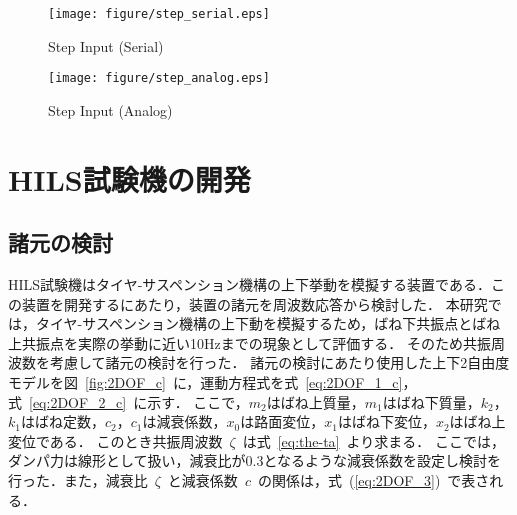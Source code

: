 \documentclass[a4paper,12pt]{article_vdlab_sotsuron}
\begin{document}
\vspace{10mm}
\begin{figure}[h]
  \begin{center}
  \hspace{5mm}
   \texttt{[image: figure/step\_serial.eps]}
   \hspace{-5mm}
  \vspace{2mm}
\caption{Step Input (Serial)}
  \label{fig:step_serial}
  \end{center}
\end{figure}
  \vspace{10mm}
\begin{figure}[h]
  \begin{center}
  \hspace{5mm}
   \texttt{[image: figure/step\_analog.eps]}
   \hspace{-5mm}
  \vspace{2mm}
\caption{Step Input (Analog)}
  \label{fig:step_analog}
  \end{center}
\end{figure}



\newpage
\section{HILS試験機の開発}
\subsection{諸元の検討}
HILS試験機はタイヤ-サスペンション機構の上下挙動を模擬する装置である．この装置を開発するにあたり，装置の諸元を周波数応答から検討した．
本研究では，タイヤ-サスペンション機構の上下動を模擬するため，ばね下共振点とばね上共振点を実際の挙動に近い10Hzまでの現象として評価する．
そのため共振周波数を考慮して諸元の検討を行った．
諸元の検討にあたり使用した上下2自由度モデルを図~\ref{fig:2DOF_c}~に，運動方程式を式~\ref{eq:2DOF_1_c}，式~\ref{eq:2DOF_2_c}~に示す．
ここで，$m_2$はばね上質量，$m_1$はばね下質量，$k_2$，$k_1$はばね定数，$c_2$，$c_1$は減衰係数，$x_0$は路面変位，$x_1$はばね下変位，$x_2$はばね上変位である．
このとき共振周波数\ $\zeta$\ は式~\ref{eq:the-ta}~より求まる．
ここでは，ダンパ力は線形として扱い，減衰比が0.3となるような減衰係数を設定し検討を行った．また，減衰比\ $ \zeta $\ と減衰係数\ $c$\ の関係は，式~(\ref{eq:2DOF_3})~で表される．
\end{document}
